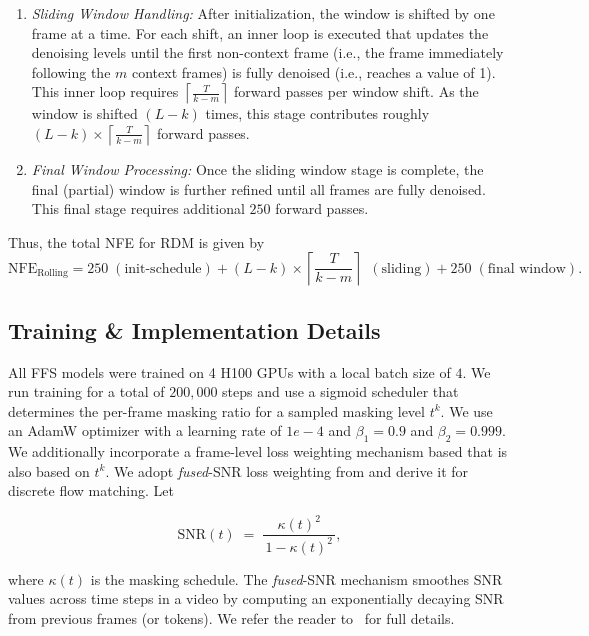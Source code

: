 \begin{itemize}
\begin{enumerate}
        \item \textit{Sliding Window Handling:} After initialization, the window is shifted by one frame at a time. For each shift, an inner loop is executed that updates the denoising levels until the first non-context frame (i.e., the frame immediately following the \(m\) context frames) is fully denoised (i.e., reaches a value of 1). This inner loop requires $\left\lceil \frac{T}{k-m} \right\rceil$ forward passes per window shift. As the window is shifted \((L - k)\) times, this stage contributes roughly \((L - k) \times \left\lceil \frac{T}{k-m} \right\rceil\) forward passes.
        
        \item \textit{Final Window Processing:} Once the sliding window stage is complete, the final (partial) window is further refined until all frames are fully denoised. This final stage requires additional $250$ forward passes.
    \end{enumerate}
    
    Thus, the total NFE for RDM is given by
    \[
    \text{NFE}_{\mathrm{Rolling}} = 250 \; (\text{init-schedule}) + (L - k) \times \left\lceil \frac{T}{k-m} \right\rceil\ \; (\text{sliding}) + 250 \; (\text{final window}).
    \]
\end{itemize}




\subsection{Training \& Implementation Details}

All FFS models were trained on 4 H100 GPUs with a local batch size of $4$. We run training for a total of $200{,}000$ steps and use a sigmoid scheduler that determines the per-frame masking ratio for a sampled masking level $t^k$. We use an AdamW optimizer with a learning rate of $1e-4$ and $\beta_1 = 0.9$ and $\beta_2 = 0.999$. We additionally incorporate a frame-level loss weighting mechanism based that is also based on \(t^k\). We adopt \emph{fused}-SNR loss weighting from \cite{hang2023efficient,chen2024diffusionforcing} and derive it for discrete flow matching. Let

\[
\text{SNR}(t) \;=\; \frac{\kappa(t)^2}{\,1 - \kappa(t)^2\,},
\]

where \(\kappa(t)\) is the masking schedule. The \emph{fused}-SNR mechanism smoothes SNR values across time steps in a video by computing an exponentially decaying SNR from previous frames (or tokens). We refer the reader to~\cite{chen2024diffusionforcing} for full details.


